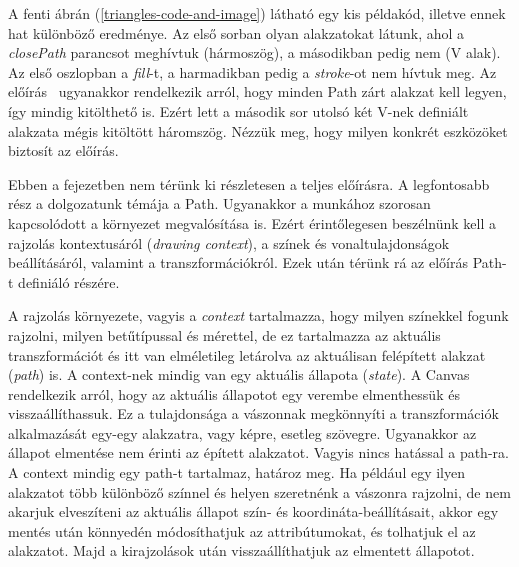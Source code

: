 \documentclass[12pt]{report}
\theoremstyle{definition}
\newcommand{\inenglish}[1]{\textsl{#1}}
\begin{document}
A fenti ábrán (\ref{triangles-code-and-image}) látható egy kis példakód,
illetve ennek hat különböző eredménye. Az első sorban olyan alakzatokat látunk,
ahol a \emph{closePath} parancsot meghívtuk (hármoszög), a másodikban pedig nem
(V alak). Az első oszlopban a \emph{fill}-t, a harmadikban pedig a
\emph{stroke}-ot nem hívtuk meg. Az előírás~\cite{Cabanier:14:HCC} ugyanakkor
rendelkezik arról, hogy minden Path zárt alakzat kell legyen, így mindig
kitölthető is. Ezért lett a második sor utolsó két V-nek definiált alakzata
mégis kitöltött háromszög. Nézzük meg, hogy milyen konkrét eszközöket biztosít
az előírás.

Ebben a fejezetben nem térünk ki részletesen a teljes előírásra. A legfontosabb
rész a dolgozatunk témája a Path. Ugyanakkor a munkához szorosan kapcsolódott a
környezet megvalósítása is. Ezért érintőlegesen beszélnünk kell a rajzolás
kontextusáról (\inenglish{drawing context}), a színek és vonaltulajdonságok
beállításáról, valamint a transzformációkról. Ezek után térünk rá az előírás
Path-t definiáló részére.

A rajzolás környezete, vagyis a \emph{context} tartalmazza, hogy milyen
színekkel fogunk rajzolni, milyen betűtípussal és mérettel, de ez tartalmazza
az aktuális transzformációt és itt van elméletileg letárolva az aktuálisan
felépített alakzat (\inenglish{path}) is. A context-nek mindig van egy aktuális
állapota (\inenglish{state}). A Canvas rendelkezik arról, hogy az aktuális
állapotot egy verembe elmenthessük és visszaállíthassuk. Ez a tulajdonsága a
vászonnak megkönnyíti a transzformációk alkalmazását egy-egy alakzatra, vagy
képre, esetleg szövegre. Ugyanakkor az állapot elmentése nem érinti az épített
alakzatot. Vagyis nincs hatással a path-ra. A context mindig egy path-t
tartalmaz, határoz meg. Ha például egy ilyen alakzatot több különböző színnel
és helyen szeretnénk a vászonra rajzolni, de nem akarjuk elveszíteni az
aktuális állapot szín- és koordináta-beállításait, akkor egy mentés után
könnyedén módosíthatjuk az attribútumokat, és tolhatjuk el az alakzatot. Majd a
kirajzolások után visszaállíthatjuk az elmentett állapotot.
\end{document}
